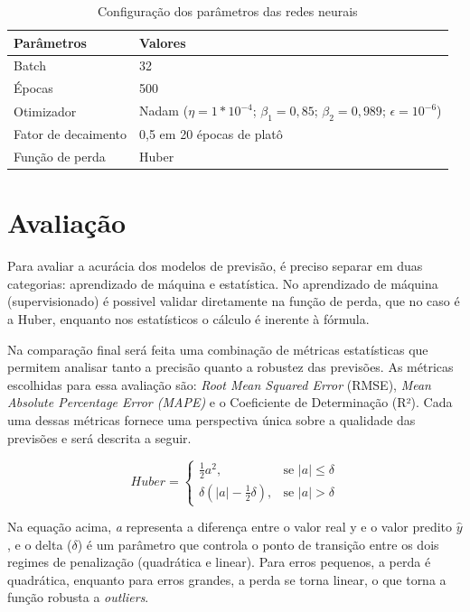 \begin{table}[h!]
    \caption{Configuração dos parâmetros das redes neurais} \label{tabela:parametros}
    \begin{tabularx}{\textwidth}{X|X} \hline
    Parâmetros & Valores \\ \hline
    Batch         & 32               \\ \hline
    Épocas         & 500              \\ \hline
    Otimizador               & Nadam ($\eta=1*10^{-4}$; $\beta_1=0{,}85$; $\beta_2=0{,}989$; $\epsilon=10^{-6}$)             \\ \hline
    Fator de decaimento          & 0,5 em 20 épocas de platô            \\ \hline
    Função de perda          & Huber              \\ \hline
    \end{tabularx}
\end{table}

\section{Avaliação} \label{sec:avaliacao}
Para avaliar a acurácia dos modelos de previsão, é preciso separar em duas categorias: aprendizado de máquina e estatística.
No aprendizado de máquina (supervisionado) é possivel validar diretamente na função de perda, que no caso é a Huber, enquanto nos estatísticos o cálculo é inerente à fórmula.

Na comparação final será feita uma combinação de métricas estatísticas 
que permitem analisar tanto a precisão quanto a robustez das previsões.
As métricas escolhidas para essa avaliação são: 
\textit{Root Mean Squared Error} (RMSE), \textit{Mean Absolute Percentage Error (MAPE)} e o Coeficiente de Determinação (R²). Cada uma dessas métricas fornece uma perspectiva única sobre a qualidade das previsões e será descrita a seguir.

\begin{equation}
Huber = 
\begin{cases} 
\frac{1}{2} a^2, & \text{se } |a| \leq \delta \\
\delta (|a| - \frac{1}{2} \delta), & \text{se } |a| > \delta 
\end{cases}
\end{equation}

Na equação acima, \textit{a} representa a diferença entre o valor real y e o valor predito  $\hat{y}$, e o delta ($  \delta $) é um parâmetro que controla o ponto de transição entre os dois regimes de penalização (quadrática e linear). Para erros pequenos, a perda é quadrática, enquanto para erros grandes, a perda se torna linear, o que torna a função robusta a \textit{outliers}.

